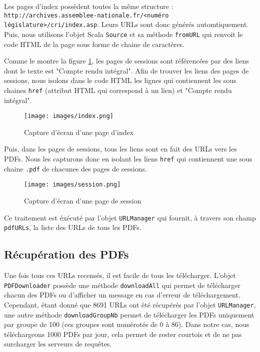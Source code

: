 Les pages d'index possèdent toutes la même structure : \verb|http://archives.assemblee-nationale.fr/<numéro législature>/cri/index.asp|. Leurs URLs sont donc générés automtiquement. Puis, nous utilisons l'objet Scala \verb|Source| et sa méthode \verb|fromURL| qui renvoit le code HTML de la page sous forme de chaine de caractères.

Comme le montre la figure \ref{figure_index}, les pages de sessions sont référencées par des liens dont le texte est "Compte rendu intégral". Afin de trouver les liens des pages de sessions, nous isolons dans le code HTML les lignes qui contiennent les sous chaines \verb|href| (attribut HTML qui correspond à un lien) et "Compte rendu intégral".

\vspace{0.2cm}
\begin{figure}[!h]
\texttt{[image: images/index.png]}
\caption{Capture d'écran d'une page d'index}
\label{figure_index}
\end{figure}
\vspace{0.2cm}

Puis, dans les pages de sessions, tous les liens sont en fait des URLs vers les PDFs. Nous les capturons donc en isolant les liens \verb|href| qui contiennent une sous chaine \verb|.pdf| de chacunes des pages de sessions.

\vspace{0.2cm}
\begin{figure}[!h]
\texttt{[image: images/session.png]}
\caption{Capture d'écran d'une page de session}
\end{figure}
\vspace{0.2cm}

Ce traitement est éxécuté par l'objet \verb|URLManager| qui fournit, à travers son champ \verb|pdfURLs|, la liste des URLs de tous les PDFs.

\subsection{Récupération des PDFs}

Une fois tous ces URLs recensés, il est facile de tous les télécharger. L'objet \verb|PDFDownloader| possède une méthode \verb|downloadAll| qui permet de télécharger chacun des PDFs ou d'afficher un message en cas d'erreur de téléchargement. Cependant, étant donné que 8691 URLs ont été récupérés par l'objet \verb|URLManager|, une autre méthode \verb|downloadGroupNb| permet de télécharger les PDFs uniquement par groupe de 100 (ces groupes sont numérotés de 0 à 86). Dans notre cas, nous téléchargeons 1000 PDFs par jour, cela permet de rester courtois et de ne pas surcharger les serveurs de requêtes.

